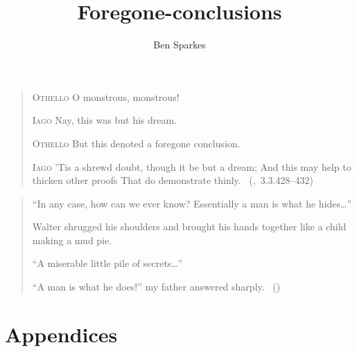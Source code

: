 \documentclass[10pt]{report}
\title{Foregone-conclusions}
\author{Ben Sparkes}
\begin{document}
\nocite{Lewis:1973aa}


\maketitle


\setcounter{page}{4}

\begin{quote}
  \textsc{Othello} O monstrous, monstrous!

  \textsc{Iago}\phantom{O monstrous, monstrous! Nay,} Nay, this was but his dream.

  \textsc{Othello} But this denoted a foregone conclusion.

  \textsc{Iago} 'Tis a shrewd doubt, though it be but a dream;\newline
  And this may help to thicken other proofs\newline
  That do demonstrate thinly.\newline
  \mbox{ }\hfill\mbox{(, 3.3.428--432)}
\end{quote}

\vfill

\begin{quote}
  ``In any case, how can we ever know? Essentially a man is what he hides\dots''

  Walter shrugged his shoulders and brought his hands together like a child making a mud pie.

  ``A miserable little pile of secrets\dots''

  ``A man is what he does!'' my father answered sharply.\newline
  \mbox{ }\hfill\mbox{(\cite[20]{Malraux:1968aa})}
\end{quote}

\nocite{Tichy:1976tp}
\nocite{Chisholm:1955aa}
\nocite{Kratzer:1989aa}
\nocite{Davidson:1973vd}
\nocite{Hackl:1998tt,Austin:1961vz}

\tableofcontents

\newpage

\setcounter{page}{1}


















\appendix

\part*{Appendices}








\printbibliography
\end{document}
